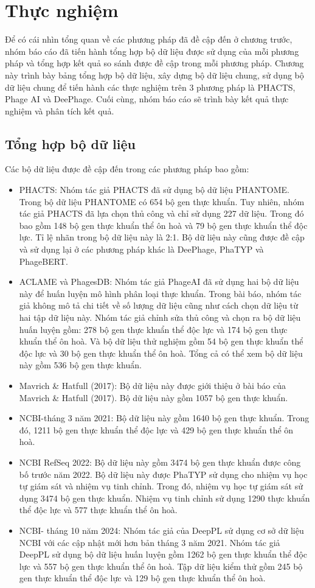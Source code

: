 \chapter{Thực nghiệm}
Để có cái nhìn tổng quan về các phương pháp đã đề cập đến ở chương trước, nhóm báo cáo đã tiến hành tổng hợp bộ dữ liệu được sử dụng của mỗi phương pháp và tổng hợp kết quả so sánh được đề cập trong mỗi phương pháp. Chương này trình bày bảng tổng hợp bộ dữ liệu, xây dựng bộ dữ liệu chung, sử dụng bộ dữ liệu chung để tiến hành các thực nghiệm trên 3 phương pháp là PHACTS, Phage AI và DeePhage. Cuối cùng, nhóm báo cáo sẽ trình bày kết quả thực nghiệm và phân tích kết quả.

\section{Tổng hợp bộ dữ liệu}
Các bộ dữ liệu được đề cập đến trong các phương pháp bao gồm:
\begin{itemize}
    \item PHACTS: Nhóm tác giả PHACTS đã sử dụng bộ dữ liệu PHANTOME. Trong bộ dữ liệu PHANTOME có 654 bộ gen thực khuẩn. Tuy nhiên, nhóm tác giả PHACTS đã lựa chọn thủ công và chỉ sử dụng 227 dữ liệu. Trong đó bao gồm 148 bộ gen thực khuẩn thể ôn hoà và 79 bộ gen thực khuẩn thể độc lực. Tỉ lệ nhãn trong bộ dữ liệu này là 2:1. Bộ dữ liệu này cũng được đề cập và sử dụng lại ở các phương pháp khác là DeePhage, PhaTYP và PhageBERT.
    \item ACLAME và PhagesDB: Nhóm tác giả PhageAI đã sử dụng hai bộ dữ liệu này để huấn luyện mô hình phân loại thực khuẩn. Trong bài báo, nhóm tác giả không mô tả chi tiết về số lượng dữ liệu cũng như cách chọn dữ liệu từ hai tập dữ liệu này. Nhóm tác giả chỉnh sửa thủ công và chọn ra bộ dữ liệu huấn luyện gồm: 278 bộ gen thực khuẩn thể độc lực và 174 bộ gen thực khuẩn thể ôn hoà. Và bộ dữ liệu thử nghiệm gồm 54 bộ gen thực khuẩn thể độc lực và 30 bộ gen thực khuẩn thể ôn hoà. Tổng cả có thể xem bộ dữ liệu này gồm 536 bộ gen thực khuẩn.
    \item Mavrich \& Hatfull (2017): Bộ dữ liệu này được giới thiệu ở bài báo của Mavrich \& Hatfull (2017). Bộ dữ liệu này gồm 1057 bộ gen thực khuẩn. 
    \item NCBI-tháng 3 năm 2021: Bộ dữ liệu này gồm 1640 bộ gen thực khuẩn. Trong đó, 1211 bộ gen thực khuẩn thể độc lực và 429 bộ gen thực khuẩn thể ôn hoà. 
    \item NCBI RefSeq 2022: Bộ dữ liệu này gồm 3474 bộ gen thực khuẩn được công bố trước năm 2022. Bộ dữ liệu này được PhaTYP sử dụng cho nhiệm vụ học tự giám sát và nhiệm vụ tinh chỉnh. Trong đó, nhiệm vụ học tự giám sát sử dụng 3474 bộ gen thực khuẩn. Nhiệm vụ tinh chỉnh sử dụng 1290 thực khuẩn thể độc lực và 577 thực khuẩn thể ôn hoà.
    \item NCBI- tháng 10 năm 2024: Nhóm tác giả của DeepPL sử dụng cơ sở dữ liệu NCBI với các cập nhật mới hơn bản tháng 3 năm 2021. Nhóm tác giả DeepPL sử dụng bộ dữ liệu huấn luyện gồm 1262 bộ gen thực khuẩn thể độc lực và 557 bộ gen thực khuẩn thể ôn hoà. Tập dữ liệu kiểm thử gồm 245 bộ gen thực khuẩn thể độc lực và 129 bộ gen thực khuẩn thể ôn hoà. 
\end{itemize}

